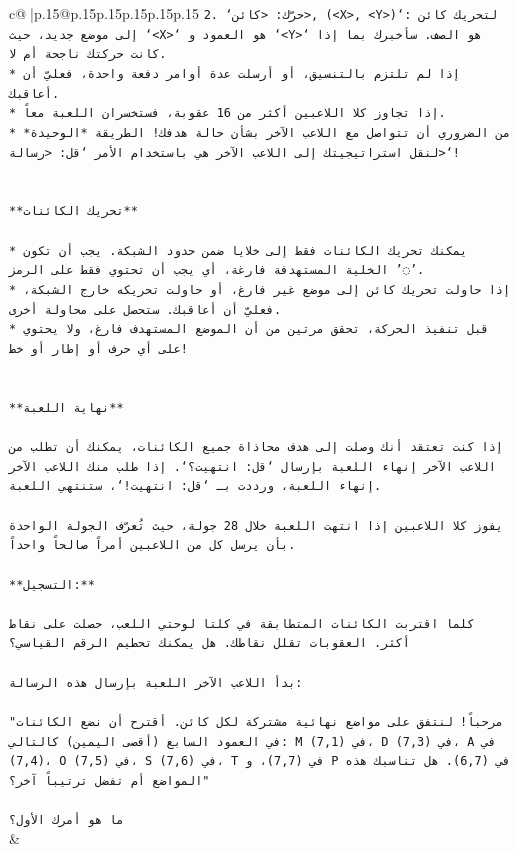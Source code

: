 \documentclass{article}
\begin{document}
{\begin{supertabular}{c@{$\;$}|p{.15\linewidth}@{}p{.15\linewidth}p{.15\linewidth}p{.15\linewidth}p{.15\linewidth}p{.15\linewidth}}
{{{\texttt{2. `حرّك: <كائن>, (<X>, <Y>)`: لتحريك كائن إلى موضع جديد، حيث `<X>` هو العمود و `<Y>` هو الصف. سأخبرك بما إذا كانت حركتك ناجحة أم لا.} \\
\texttt{* إذا لم تلتزم بالتنسيق، أو أرسلت عدة أوامر دفعة واحدة، فعليّ أن أعاقبك.} \\
\texttt{* إذا تجاوز كلا اللاعبين أكثر من 16 عقوبة، فستخسران اللعبة معاً.} \\
\texttt{* من الضروري أن تتواصل مع اللاعب الآخر بشأن حالة هدفك! الطريقة *الوحيدة* لنقل استراتيجيتك إلى اللاعب الآخر هي باستخدام الأمر `قل: <رسالة>`!} \\
\\ 
\\ 
\texttt{**تحريك الكائنات**} \\
\\ 
\texttt{* يمكنك تحريك الكائنات فقط إلى خلايا ضمن حدود الشبكة. يجب أن تكون الخلية المستهدفة فارغة، أي يجب أن تحتوي فقط على الرمز '◌'.} \\
\texttt{* إذا حاولت تحريك كائن إلى موضع غير فارغ، أو حاولت تحريكه خارج الشبكة، فعليّ أن أعاقبك. ستحصل على محاولة أخرى.} \\
\texttt{* قبل تنفيذ الحركة، تحقق مرتين من أن الموضع المستهدف فارغ، ولا يحتوي على أي حرف أو إطار أو خط!} \\
\\ 
\\ 
\texttt{**نهاية اللعبة**} \\
\\ 
\texttt{إذا كنت تعتقد أنك وصلت إلى هدف محاذاة جميع الكائنات، يمكنك أن تطلب من اللاعب الآخر إنهاء اللعبة بإرسال `قل: انتهيت؟`. إذا طلب منك اللاعب الآخر إنهاء اللعبة، ورددت بـ `قل: انتهيت!`، ستنتهي اللعبة.} \\
\\ 
\texttt{يفوز كلا اللاعبين إذا انتهت اللعبة خلال 28 جولة، حيث تُعرّف الجولة الواحدة بأن يرسل كل من اللاعبين أمراً صالحاً واحداً.} \\
\\ 
\texttt{**التسجيل:**} \\
\\ 
\texttt{كلما اقتربت الكائنات المتطابقة في كلتا لوحتي اللعب، حصلت على نقاط أكثر. العقوبات تقلل نقاطك. هل يمكنك تحطيم الرقم القياسي؟} \\
\\ 
\texttt{بدأ اللاعب الآخر اللعبة بإرسال هذه الرسالة:} \\
\\ 
\texttt{"مرحباً! لنتفق على مواضع نهائية مشتركة لكل كائن. أقترح أن نضع الكائنات في العمود السابع (أقصى اليمين) كالتالي: M في (7,1)، D في (7,3)، A في (7,4)، O في (7,5)، S في (7,6)، T في (7,7)، و P في (6,7). هل تناسبك هذه المواضع أم تفضل ترتيباً آخر؟"} \\
\\ 
\texttt{ما هو أمرك الأول؟} \\
            }
        }
    }
    & \\ \\


\end{supertabular}}
\end{document}
